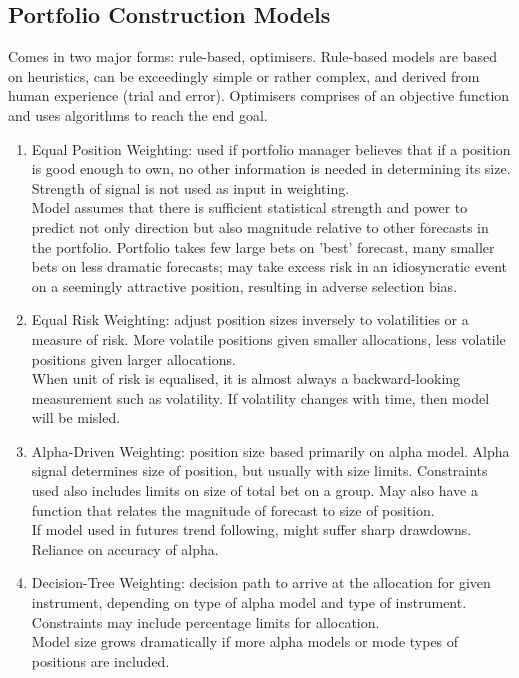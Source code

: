 \subsection{Portfolio Construction Models}

Comes in two major forms: rule-based, optimisers. Rule-based models are based on heuristics, can be exceedingly simple or rather complex, and derived from human experience (trial and error). Optimisers comprises of an objective function and uses algorithms to reach the end goal.

\begin{definition} 
\begin{enumerate}[label=\roman*.]
\setlength{\itemsep}{0pt}
\item Equal Position Weighting: used if portfolio manager believes that if a position is good enough to own, no other information is needed in determining its size. Strength of signal is not used as input in weighting.\\
Model assumes that there is sufficient statistical strength and power to predict not only direction but also magnitude relative to other forecasts in the portfolio. Portfolio takes few large bets on 'best' forecast, many smaller bets on less dramatic forecasts; may take excess risk in an idiosyncratic event on a seemingly attractive position, resulting in adverse selection bias.
\item Equal Risk Weighting: adjust position sizes inversely to volatilities or a measure of risk. More volatile positions given smaller allocations, less volatile positions given larger allocations.\\
When unit of risk is equalised, it is almost always a backward-looking measurement such as volatility. If volatility changes with time, then model will be misled.
\item Alpha-Driven Weighting: position size based primarily on alpha model. Alpha signal determines size of position, but usually with size limits. Constraints used also includes limits on size of total bet on a group. May also have a function that relates the magnitude of forecast to size of position.\\
If model used in futures trend following, might suffer sharp drawdowns. Reliance on accuracy of alpha.
\item Decision-Tree Weighting: decision path to arrive at the allocation for given instrument, depending on type of alpha model and type of instrument. Constraints may include percentage limits for allocation.\\
Model size grows dramatically if more alpha models or mode types of positions are included.
\end{enumerate}
\end{definition}

